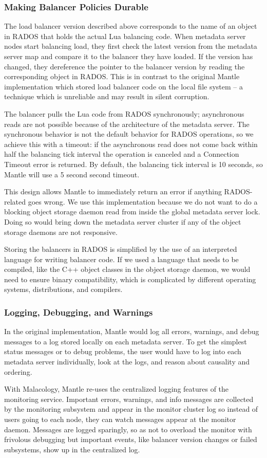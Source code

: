 \subsubsection{Making Balancer Policies Durable}

The load balancer version described above corresponds to the name of an object
in RADOS that holds the actual Lua balancing code.  When metadata server nodes
start balancing load, they first check the latest version from the metadata
server map and compare it to the balancer they have loaded. If the version has
changed, they dereference the pointer to the balancer version by reading the
corresponding object in RADOS. This is in contrast to the original Mantle
implementation which stored load balancer code on the local file system -- a
technique which is unreliable and may result in silent corruption.

The balancer pulls the Lua code from RADOS synchronously; asynchronous reads
are not possible because of the architecture of the metadata server. The
synchronous behavior is not the default behavior for RADOS operations, so we
achieve this with a timeout: if the asynchronous read does not come back within
half the balancing tick interval the operation is canceled and a Connection
Timeout error is returned. By default, the balancing tick interval is 10
seconds, so Mantle will use a 5 second second timeout.

This design allows Mantle to immediately return an error if anything
RADOS-related goes wrong.  We use this implementation because we do not want to
do a blocking object storage daemon read from inside the global metadata server
lock. Doing so would bring down the metadata server cluster if any of the
object storage daemons are not responsive.

Storing the balancers in RADOS is simplified by the use of an interpreted
language for writing balancer code. If we used a language that needs to be
compiled, like the C++ object classes in the object storage daemon, we would
need to ensure binary compatibility, which is complicated by different
operating systems, distributions, and compilers.

\subsubsection{Logging, Debugging, and Warnings}

In the original implementation, Mantle would log all errors, warnings, and
debug messages to a log stored locally on each metadata server. To get the
simplest status messages or to debug problems, the user would have to log into
each metadata server individually, look at the logs, and reason about causality
and ordering.

With Malacology, Mantle re-uses the centralized logging features of the
monitoring service. Important errors, warnings, and info messages are collected
by the monitoring subsystem and appear in the monitor cluster log so instead of
users going to each node, they can watch messages appear at the monitor daemon.
Messages are logged sparingly, so as not to overload the monitor with frivolous
debugging but important events, like balancer version changes or failed
subsystems, show up in the centralized log.

